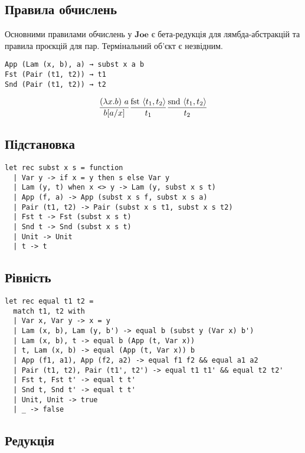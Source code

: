 \documentclass{article}
\theoremstyle{definition}
\begin{document}
\subsection{Правила обчислень}

Основними правилами обчислень у $\mathbf{Joe}$ є бета-редукція для лямбда-абстракцій та правила проєкцій для пар. Термінальний об’єкт є незвідним.

\begin{lstlisting}[mathescape=true]
App (Lam (x, b), a) → subst x a b
Fst (Pair (t1, t2)) → t1
Snd (Pair (t1, t2)) → t2
\end{lstlisting}

$$
\frac{(\lambda x . b)\ a}{b [a/x]} \\[10pt]
\frac{\text{fst}\ \langle t_1, t_2 \rangle}{t_1} \\[10pt]
\frac{\text{snd}\ \langle t_1, t_2 \rangle}{t_2}
$$

\subsection{Підстановка}

\begin{lstlisting}[mathescape=true]
let rec subst x s = function
  | Var y -> if x = y then s else Var y
  | Lam (y, t) when x <> y -> Lam (y, subst x s t)
  | App (f, a) -> App (subst x s f, subst x s a)
  | Pair (t1, t2) -> Pair (subst x s t1, subst x s t2)
  | Fst t -> Fst (subst x s t)
  | Snd t -> Snd (subst x s t)
  | Unit -> Unit
  | t -> t
\end{lstlisting}

\subsection{Рівність}

\begin{lstlisting}[mathescape=true]
let rec equal t1 t2 =
  match t1, t2 with
  | Var x, Var y -> x = y
  | Lam (x, b), Lam (y, b') -> equal b (subst y (Var x) b')
  | Lam (x, b), t -> equal b (App (t, Var x))
  | t, Lam (x, b) -> equal (App (t, Var x)) b
  | App (f1, a1), App (f2, a2) -> equal f1 f2 && equal a1 a2
  | Pair (t1, t2), Pair (t1', t2') -> equal t1 t1' && equal t2 t2'
  | Fst t, Fst t' -> equal t t'
  | Snd t, Snd t' -> equal t t'
  | Unit, Unit -> true
  | _ -> false
\end{lstlisting}

\subsection{Редукція}
\end{document}
